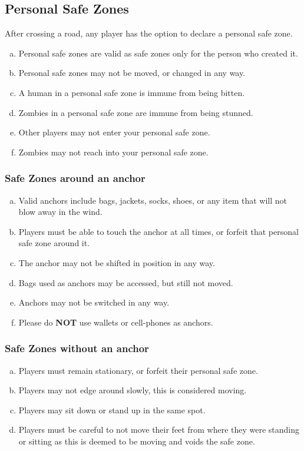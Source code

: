 \documentclass[a4paper,12pt]{article}
\begin{document}
\subsection{Personal Safe Zones}
\label{PersonalSafeZoneRules}
After crossing a road, any player has the option to declare a personal safe zone.
\begin{enumerate}[(a)]
    \item Personal safe zones are valid as safe zones only for the person who created it.
    \item Personal safe zones may not be moved, or changed in any way.
    \item A human in a personal safe zone is immune from being bitten.
    \item Zombies in a personal safe zone are immune from being stunned.
    \item Other players may not enter your personal safe zone.
    \item Zombies may not reach into your personal safe zone.
\end{enumerate} 

\subsubsection{Safe Zones around an anchor}

\begin{enumerate}[(a)]
    \item Valid anchors include bags, jackets, socks, shoes, or any item that will not blow away in the wind.
    \item Players must be able to touch the anchor at all times, or forfeit that personal safe zone around it.
    \item The anchor may not be shifted in position in any way.
    \item Bags used as anchors may be accessed, but still not moved.
    \item Anchors may not be switched in any way.
    \item Please do {\bf NOT} use wallets or cell-phones as anchors.
\end{enumerate}

\subsubsection{Safe Zones without an anchor}
\begin{enumerate}[(a)]
    \item Players must remain stationary, or forfeit their personal safe zone.
    \item Players may not edge around slowly, this is considered moving.
    \item Players may sit down or stand up in the same spot. 
    \item Players must be careful to not move their feet from where they were standing or sitting as this is deemed to be moving and voids the safe zone.
\end{enumerate}
\end{document}
